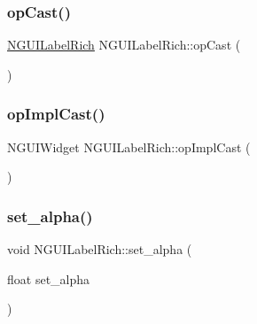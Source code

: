 \hypertarget{class_n_g_u_i_label_rich_ac2ae816b666180bf9ff0619dee60e200}{}\label{class_n_g_u_i_label_rich_ac2ae816b666180bf9ff0619dee60e200} 
\subsubsection{\texorpdfstring{op\+Cast()}{opCast()}}
{\footnotesize\ttfamily \hyperlink{class_n_g_u_i_label_rich}{N\+G\+U\+I\+Label\+Rich} N\+G\+U\+I\+Label\+Rich\+::op\+Cast (\begin{DoxyParamCaption}{ }\end{DoxyParamCaption})}

\hypertarget{class_n_g_u_i_label_rich_a3c181db8a6bf0668541b6e47ac04150a}{}\label{class_n_g_u_i_label_rich_a3c181db8a6bf0668541b6e47ac04150a} 
\subsubsection{\texorpdfstring{op\+Impl\+Cast()}{opImplCast()}}
{\footnotesize\ttfamily N\+G\+U\+I\+Widget N\+G\+U\+I\+Label\+Rich\+::op\+Impl\+Cast (\begin{DoxyParamCaption}{ }\end{DoxyParamCaption})}

\hypertarget{class_n_g_u_i_label_rich_ab4158de1a158e7a89b81be395b039cba}{}\label{class_n_g_u_i_label_rich_ab4158de1a158e7a89b81be395b039cba} 
\subsubsection{\texorpdfstring{set\+\_\+alpha()}{set\_alpha()}}
{\footnotesize\ttfamily void N\+G\+U\+I\+Label\+Rich\+::set\+\_\+alpha (\begin{DoxyParamCaption}\item[{float}]{set\+\_\+alpha }\end{DoxyParamCaption})}

\hypertarget{class_n_g_u_i_label_rich_a3661fa74eaac9d2dad0e47222b1234eb}{}\label{class_n_g_u_i_label_rich_a3661fa74eaac9d2dad0e47222b1234eb} 
